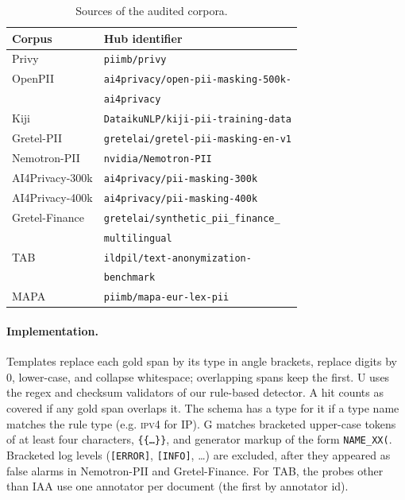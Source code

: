 \documentclass[11pt]{article}
\begin{document}
\begin{table}[h]
\centering
\footnotesize
\setlength{\tabcolsep}{3pt}
\begin{tabular}{@{}ll@{}}
\toprule
Corpus & Hub identifier \\
\midrule
Privy & \texttt{piimb/privy} \\
OpenPII & \texttt{ai4privacy/open-pii-masking-500k-}\\
 & \quad\texttt{ai4privacy} \\
Kiji & \texttt{DataikuNLP/kiji-pii-training-data} \\
Gretel-PII & \texttt{gretelai/gretel-pii-masking-en-v1} \\
Nemotron-PII & \texttt{nvidia/Nemotron-PII} \\
AI4Privacy-300k & \texttt{ai4privacy/pii-masking-300k} \\
AI4Privacy-400k & \texttt{ai4privacy/pii-masking-400k} \\
Gretel-Finance & \texttt{gretelai/synthetic\_pii\_finance\_}\\
 & \quad\texttt{multilingual} \\
TAB & \texttt{ildpil/text-anonymization-}\\
 & \quad\texttt{benchmark} \\
MAPA & \texttt{piimb/mapa-eur-lex-pii} \\
\bottomrule
\end{tabular}
\caption{Sources of the audited corpora.}
\label{tab:sources}
\end{table}

\paragraph{Implementation.}
Templates replace each gold span by its type in angle brackets, replace
digits by 0, lower-case, and collapse whitespace; overlapping spans keep
the first. U uses the regex and checksum validators of our rule-based
detector. A hit counts as covered if any gold span overlaps it. The
schema has a type for it if a type name matches the rule type (e.g.
\textsc{ipv4} for IP). G matches bracketed upper-case tokens of at least
four characters, \texttt{\{\{\ldots\}\}}, and generator markup of the
form \texttt{NAME\_XX(}. Bracketed log levels (\texttt{[ERROR]},
\texttt{[INFO]}, \ldots) are excluded, after they appeared as false
alarms in Nemotron-PII and Gretel-Finance. For TAB, the probes other than IAA
use one annotator per document (the first by annotator id).
\end{document}
